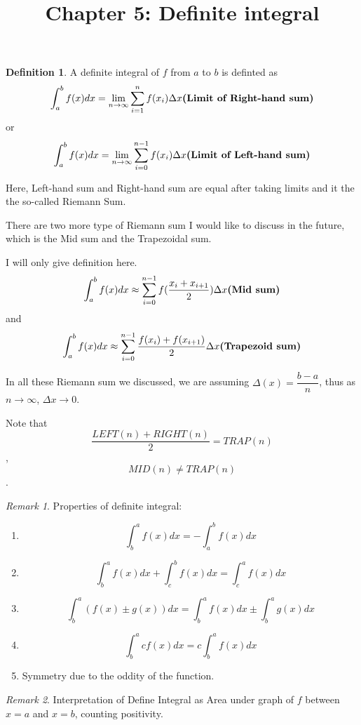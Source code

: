 \documentclass[12pt]{article}
\date{}
\title{Chapter 5: Definite integral}
\theoremstyle{definition}
\theoremstyle{definition}
\newtheorem{definition}{Definition}[section]
\theoremstyle{remark}
\newtheorem*{remark}{Remark}
\theoremstyle{definition}
\theoremstyle{definition}
\theoremstyle{definition}
\begin{document}
\maketitle







\begin{definition}
	A definite integral of $f$ from $a$ to $b$ is definted as 
\[\int_a^bf(x)dx= \lim_{n\rightarrow \infty} \sum_{i=1}^n f(x_i)\Delta x\text{\bf (Limit of Right-hand sum)}\]
or 
\[\int_a^bf(x)dx= \lim_{n\rightarrow \infty} \sum_{i=0}^{n-1} f(x_i)\Delta x\text{\bf (Limit of Left-hand sum)}\]

Here, Left-hand sum and Right-hand sum are equal after taking limits and it the the so-called Riemann Sum.
\end{definition}



There are two more type of Riemann sum I would like to discuss in the future, which is the Mid sum and the Trapezoidal sum. 

I will only give definition here.
\[\int_a^bf(x)dx\approx  \sum_{i=0}^{n-1} f(\frac{x_i+x_{i+1}}{2})\Delta x\text{\bf (Mid sum)}\]
and
\[\int_a^bf(x)dx\approx \sum_{i=0}^{n-1} \frac{f(x_i)+f(x_{i+1})}{2}\Delta x\text{\bf (Trapezoid sum)}\]

In all these Riemann sum we discussed, we are assuming $\Delta(x)=\dfrac{b-a}{n}$, thus as $n\to \infty$, $\Delta x \to 0$.

Note that \[\frac{LEFT(n)+RIGHT(n)}{2}=TRAP(n)\], \[MID(n)\neq TRAP(n)\].

\newpage

\begin{remark}
	Properties of definite integral:
	\begin{enumerate}
		\item \[\int^a_b f(x) dx = -\int^b_a f(x) dx\]
		\item \[\int^a_b f(x) dx+\int^b_c f(x) dx=\int^a_c f(x) dx\]
		\item \[\int^a_b (f(x)\pm g(x)) dx=\int^a_b f(x) dx \pm \int^a_b g(x) dx\]
		\item \[\int^a_b cf(x) dx = c \int^a_b f(x) dx\]
		\item Symmetry due to the oddity of the function.
	\end{enumerate}
\end{remark}

\hrulefill

\begin{remark}
	Interpretation of Define Integral as Area under graph of $f$ between $x=a$ and $x=b$, counting positivity.
\end{remark}
\end{document}
